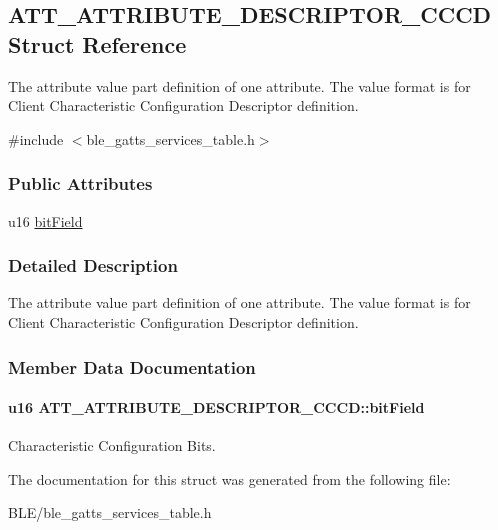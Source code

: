 \hypertarget{struct_a_t_t___a_t_t_r_i_b_u_t_e___d_e_s_c_r_i_p_t_o_r___c_c_c_d}{}\subsection{A\+T\+T\+\_\+\+A\+T\+T\+R\+I\+B\+U\+T\+E\+\_\+\+D\+E\+S\+C\+R\+I\+P\+T\+O\+R\+\_\+\+C\+C\+CD Struct Reference}
\label{struct_a_t_t___a_t_t_r_i_b_u_t_e___d_e_s_c_r_i_p_t_o_r___c_c_c_d}


The attribute value part definition of one attribute. The value format is for Client Characteristic Configuration Descriptor definition.  




{\ttfamily \#include $<$ble\+\_\+gatts\+\_\+services\+\_\+table.\+h$>$}

\subsubsection*{Public Attributes}
\begin{DoxyCompactItemize}
\item 
u16 \hyperlink{struct_a_t_t___a_t_t_r_i_b_u_t_e___d_e_s_c_r_i_p_t_o_r___c_c_c_d_a74b8a454af3315297c2ec7adfa5aff62}{bit\+Field}
\end{DoxyCompactItemize}


\subsubsection{Detailed Description}
The attribute value part definition of one attribute. The value format is for Client Characteristic Configuration Descriptor definition. 

\subsubsection{Member Data Documentation}
\paragraph[{\texorpdfstring{bit\+Field}{bitField}}]{\setlength{\rightskip}{0pt plus 5cm}u16 A\+T\+T\+\_\+\+A\+T\+T\+R\+I\+B\+U\+T\+E\+\_\+\+D\+E\+S\+C\+R\+I\+P\+T\+O\+R\+\_\+\+C\+C\+C\+D\+::bit\+Field}\hypertarget{struct_a_t_t___a_t_t_r_i_b_u_t_e___d_e_s_c_r_i_p_t_o_r___c_c_c_d_a74b8a454af3315297c2ec7adfa5aff62}{}\label{struct_a_t_t___a_t_t_r_i_b_u_t_e___d_e_s_c_r_i_p_t_o_r___c_c_c_d_a74b8a454af3315297c2ec7adfa5aff62}
Characteristic Configuration Bits. 

The documentation for this struct was generated from the following file\+:\begin{DoxyCompactItemize}
\item 
B\+L\+E/ble\+\_\+gatts\+\_\+services\+\_\+table.\+h\end{DoxyCompactItemize}
